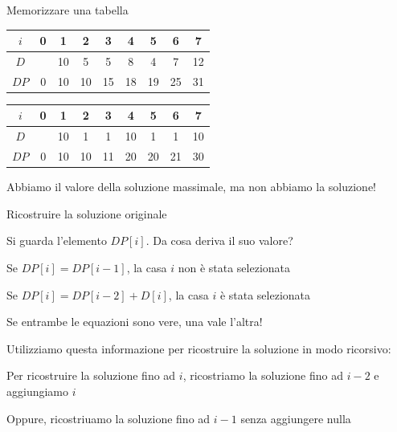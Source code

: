 \begin{frame}{Memorizzare una tabella}

\vspace{-9pt}
\begin{myboxtitle}[Esempi]
\begin{center}
\medskip
\begin{tabular}{|c|c|c|c|c|c|c|c|c|}
\hline
$i$ & 0 & 1 & 2 & 3 & 4 & 5 & 6 & 7 \\\hline
$D$ &   & 10 & 5 & 5 & 8 & 4 & 7 & 12 \\\hline
$\mathit{DP}$ & 0 & 10 & 10 & 15 & 18 & 19 & 25 & 31 \\\hline
\end{tabular}

\medskip
\begin{tabular}{|c|c|c|c|c|c|c|c|c|}
\hline
$i$ & 0 & 1 & 2 & 3 & 4 & 5 & 6 & 7 \\\hline
$D$ &   & 10 & 1 & 1 & 10 & 1 & 1 & 10 \\\hline
$\mathit{DP}$ & 0 & 10 & 10 & 11 & 20 & 20 & 21 & 30 \\\hline
\end{tabular}
\end{center}
\end{myboxtitle}

\begin{myboxtitle}[Problema]
Abbiamo il valore della soluzione massimale, ma non abbiamo
la soluzione!
\end{myboxtitle}

\end{frame}

\begin{frame}[fragile]{Ricostruire la soluzione originale}

\vspace{-9pt}
\BIL
\item Si guarda l'elemento $\mathit{DP}[i]$. Da cosa deriva il suo valore?
  \BI 
  \item Se $\mathit{DP}[i] = \mathit{DP}[i-1]$, la casa $i$ non è stata selezionata
  \item Se $\mathit{DP}[i] = \mathit{DP}[i-2]+D[i]$, la casa $i$ è stata selezionata
  \item Se entrambe le equazioni sono vere, una vale l'altra!
  \EI
\item Utilizziamo questa informazione per ricostruire la soluzione in modo
  ricorsivo:
  \BI
  \item Per ricostruire la soluzione fino ad $i$,
  ricostriamo la soluzione fino ad $i-2$ e aggiungiamo $i$
  \item Oppure, ricostriuamo la soluzione fino ad $i-1$ senza aggiungere nulla
  \EI
\EIL

\end{frame}

